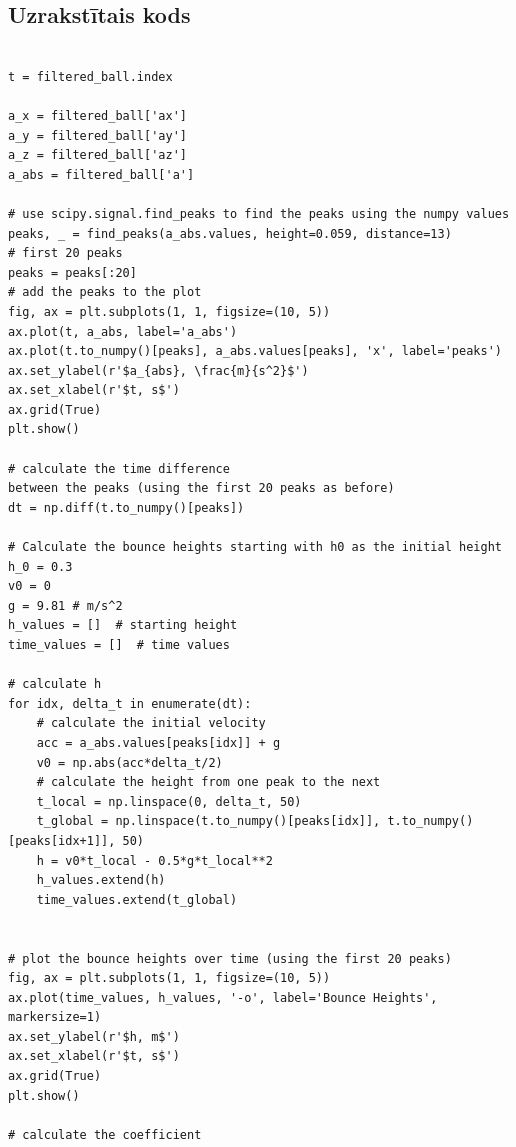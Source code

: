 \documentclass[12pt]{article}
\begin{document}
\subsection*{Uzrakstītais kods}

\begin{center}

\begin{verbatim}

t = filtered_ball.index

a_x = filtered_ball['ax']
a_y = filtered_ball['ay']
a_z = filtered_ball['az']
a_abs = filtered_ball['a']

# use scipy.signal.find_peaks to find the peaks using the numpy values
peaks, _ = find_peaks(a_abs.values, height=0.059, distance=13)
# first 20 peaks
peaks = peaks[:20]
# add the peaks to the plot
fig, ax = plt.subplots(1, 1, figsize=(10, 5))
ax.plot(t, a_abs, label='a_abs')
ax.plot(t.to_numpy()[peaks], a_abs.values[peaks], 'x', label='peaks')
ax.set_ylabel(r'$a_{abs}, \frac{m}{s^2}$')
ax.set_xlabel(r'$t, s$')
ax.grid(True)
plt.show()

# calculate the time difference
between the peaks (using the first 20 peaks as before)
dt = np.diff(t.to_numpy()[peaks])

# Calculate the bounce heights starting with h0 as the initial height
h_0 = 0.3
v0 = 0
g = 9.81 # m/s^2
h_values = []  # starting height
time_values = []  # time values

# calculate h 
for idx, delta_t in enumerate(dt):
    # calculate the initial velocity
    acc = a_abs.values[peaks[idx]] + g
    v0 = np.abs(acc*delta_t/2)
    # calculate the height from one peak to the next
    t_local = np.linspace(0, delta_t, 50)
    t_global = np.linspace(t.to_numpy()[peaks[idx]], t.to_numpy()[peaks[idx+1]], 50)
    h = v0*t_local - 0.5*g*t_local**2
    h_values.extend(h)
    time_values.extend(t_global)


# plot the bounce heights over time (using the first 20 peaks)
fig, ax = plt.subplots(1, 1, figsize=(10, 5))
ax.plot(time_values, h_values, '-o', label='Bounce Heights', markersize=1)
ax.set_ylabel(r'$h, m$')
ax.set_xlabel(r'$t, s$')
ax.grid(True)
plt.show()

# calculate the coefficient
\end{verbatim}
    
\end{center}

\renewcommand{\refname}{Izmantotā literatūra}


\end{document}

